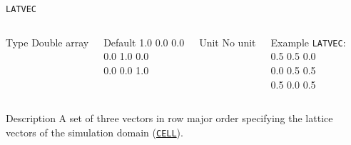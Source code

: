 \begin{frame}[allowframebreaks]{\texttt{LATVEC}} \label{LATVEC}
\vspace*{-12pt}
\begin{columns}
\begin{block}{Type}
Double array
\end{block}

\begin{block}{Default}
1.0 0.0 0.0\\
0.0 1.0 0.0\\
0.0 0.0 1.0\\
\end{block}

\begin{block}{Unit}
No unit
\end{block}

\begin{block}{Example}
\texttt{LATVEC}: \\
0.5 0.5 0.0\\
0.0 0.5 0.5\\
0.5 0.0 0.5\\
\end{block}
\end{columns}

\begin{block}{Description}
A set of three vectors in row major order specifying the lattice vectors of the simulation domain (\hyperlink{CELL}{\texttt{CELL}}).
\end{block}


\end{frame}


